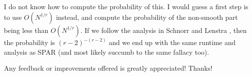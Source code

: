 \documentclass[a4paper]{article}
\begin{document}
\bigbreak
\noindent
I do not know how to compute the probability of this.  I would guess a first step is to use $O(N^{1/r})$ instead, and compute the probability of the non-smooth part being less than $O(N^{1/r})$.  If we follow the analysis in Schnorr and Lenstra \cite[pp.297--298]{Schnorr1984}, then the probability is $(r-2)^{-(r-2)}$ and we end up with the same runtime and analysis as SPAR (and most likely succumb to the same fallacy too). 

\bigbreak
\noindent
Any feedback or improvements offered is greatly appreciated!  Thanks!



\end{document}
